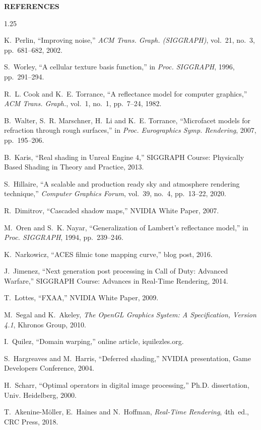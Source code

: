 \documentclass[12pt,a4paper,oneside]{report}
\begin{document}
\clearpage
{}
{}
\begin{center}{\fontsize{14}{21}\bfseries\selectfont REFERENCES}\end{center}
\vspace{4pt}
\begin{spacing}{1.25}\small
\begin{enumerate}[leftmargin=2.3em,itemindent=0pt,labelsep=0.5em,labelwidth=1.8em,itemsep=4pt,parsep=0pt,label={[\arabic*]},align=left]
	\item K.~Perlin, ``Improving noise,'' \textit{ACM Trans. Graph. (SIGGRAPH)}, vol.~21, no.~3, pp.~681--682, 2002.
	\item S.~Worley, ``A cellular texture basis function,'' in \textit{Proc. SIGGRAPH}, 1996, pp.~291--294.
	\item R.~L. Cook and K.~E. Torrance, ``A reflectance model for computer graphics,'' \textit{ACM Trans. Graph.}, vol.~1, no.~1, pp.~7--24, 1982.
	\item B.~Walter, S.~R. Marschner, H.~Li and K.~E. Torrance, ``Microfacet models for refraction through rough surfaces,'' in \textit{Proc. Eurographics Symp. Rendering}, 2007, pp.~195--206.
	\item B.~Karis, ``Real shading in Unreal Engine 4,'' SIGGRAPH Course: Physically Based Shading in Theory and Practice, 2013.
	\item S.~Hillaire, ``A scalable and production ready sky and atmosphere rendering technique,'' \textit{Computer Graphics Forum}, vol.~39, no.~4, pp.~13--22, 2020.
	\item R.~Dimitrov, ``Cascaded shadow maps,'' NVIDIA White Paper, 2007.
	\item M.~Oren and S.~K. Nayar, ``Generalization of Lambert's reflectance model,'' in \textit{Proc. SIGGRAPH}, 1994, pp.~239--246.
	\item K.~Narkowicz, ``ACES filmic tone mapping curve,'' blog post, 2016.
	\item J.~Jimenez, ``Next generation post processing in Call of Duty: Advanced Warfare,'' SIGGRAPH Course: Advances in Real-Time Rendering, 2014.
	\item T.~Lottes, ``FXAA,'' NVIDIA White Paper, 2009.
	\item M.~Segal and K.~Akeley, \textit{The OpenGL Graphics System: A Specification, Version 4.1}, Khronos Group, 2010.
	\item I.~Quilez, ``Domain warping,'' online article, iquilezles.org.
	\item S.~Hargreaves and M.~Harris, ``Deferred shading,'' NVIDIA presentation, Game Developers Conference, 2004.
	\item H.~Scharr, ``Optimal operators in digital image processing,'' Ph.D. dissertation, Univ. Heidelberg, 2000.
	\item T.~Akenine-M{\"o}ller, E.~Haines and N.~Hoffman, \textit{Real-Time Rendering}, 4th~ed., CRC Press, 2018.
\end{enumerate}
\end{spacing}
\end{document}
